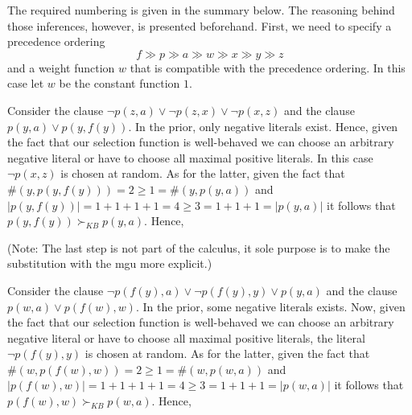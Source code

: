 \documentclass[11pt,a4paper]{article}
\begin{document}
The required numbering is given in the summary below. The reasoning behind those inferences, however, is presented beforehand.
First, we need to specify a precedence ordering 
\begin{equation*}
f \gg p \gg a  \gg w  \gg x \gg y \gg z
\end{equation*}
and a weight function $w$ that is compatible with the precedence ordering. In this case let $w$ be the constant function $1$.


Consider the clause $\neg p(z, a) \lor \neg p(z, x) \lor \neg p(x, z)$ and the clause $p(y, a) \lor p(y, f (y))$. In the prior, only negative literals exist. Hence, given the fact that our selection function is well-behaved we can choose an arbitrary negative literal or have to choose all maximal  positive literals. In this case $\neg p(x, z)$ is chosen at random. As for the latter, given the fact that $\#(y,p(y, f(y)))=2 \geq 1=\#(y,p(y, a))$ and $|p(y,f(y))|=1+1+1+1=4 \geq  3= 1+1+1 = | p(y, a)|$ it follows that $p(y,f(y)) \succ_{KB} p(y,a)$. Hence,
\begin{prooftree}
\end{prooftree}
(Note: The last step is not part of the calculus, it sole purpose is to make the substitution with the mgu more explicit.)

Consider the clause $\neg p(f(y), a) \lor \neg p(f(y), y) \lor p(y, a)$ and the clause $p(w, a) \lor p(f (w), w)$. In the prior, some negative literals exists. Now, given the fact that our selection function is well-behaved we can choose an arbitrary negative literal or have to choose all maximal  positive literals, the literal  $\neg p(f(y), y)$ is chosen at random. As for the latter, given the fact that $\#(w,p(f(w), w))=2 \geq 1=\#(w,p(w, a))$ and $|p(f(w),w)|=1+1+1+1=4 \geq  3=1+1+1 = | p(w, a)|$ it follows that $p(f(w),w) \succ_{KB} p(w,a)$. Hence,
\begin{prooftree}
\end{prooftree}
\end{document}
